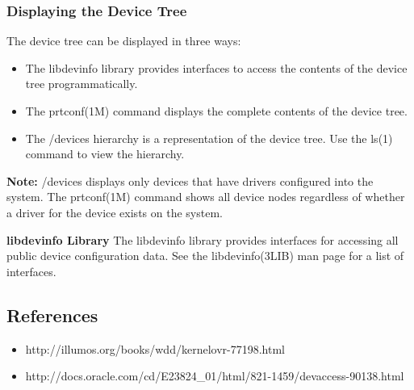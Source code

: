 \documentclass[11pt]{article}
\begin{document}
\subsubsection*{Displaying the Device Tree}

The device tree can be displayed in three ways:

\begin{itemize}

\item The libdevinfo library provides interfaces to access the contents of the
  device tree programmatically.
\item The prtconf(1M) command displays the complete contents of the device
  tree.
\item The /devices hierarchy is a representation of the device tree. Use the
  ls(1) command to view the hierarchy.
\end{itemize}

{\bf Note:}
/devices displays only devices that have drivers configured into the system. The
prtconf(1M) command shows all device nodes regardless of whether a driver for
the device exists on the system.

{\bf libdevinfo Library}
The libdevinfo library provides interfaces for accessing all public device
configuration data. See the libdevinfo(3LIB) man page for a list of interfaces.

\subsection*{References}
\begin{itemize}
\item[] http://illumos.org/books/wdd/kernelovr-77198.html
\item[] http://docs.oracle.com/cd/E23824\_01/html/821-1459/devaccess-90138.html
\end{itemize}
\end{document}
